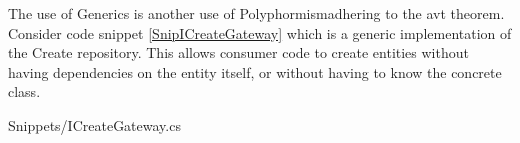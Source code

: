 The use of Generics is another use of Polyphormismadhering to the \gls{avt} theorem.
Consider code snippet \ref{SnipICreateGateway}  which is a
generic implementation of the Create repository. This allows consumer code to create
entities without having dependencies on the entity itself, or without having to know the
concrete class.


    {Snippets/ICreateGateway.cs}